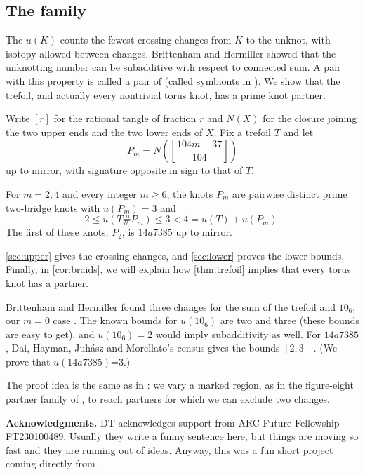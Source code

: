 \documentclass[a4paper,11pt]{amsart}
\let\emph\relax
\numberwithin{equation}{subsection}
\theoremstyle{plain}
\theoremstyle{remark}
\begin{document}
\subsection{The family}\label{sec:main}

The \emph{unknotting number} $u(K)$ counts the fewest crossing changes from $K$ to the unknot, with isotopy allowed between changes. Brittenham and Hermiller \cite{BH-annals} showed that the unknotting number can be subadditive with respect to connected sum. A pair with this property is called a pair of \emph{partners} (called symbionts in \cite{BH-small}). We show that the trefoil, and actually every nontrivial torus knot, has a prime knot partner.

Write $[r]$ for the rational tangle of fraction $r$ and $N(X)$ for the closure joining the two upper ends and the two lower ends of $X$. Fix a trefoil $T$ and let
\[
P_m=N\!\left(\left[\frac{104m+37}{104}\right]\right)
\]
up to mirror, with signature opposite in sign to that of $T$.

\begin{Theorem}\label{thm:trefoil}
For $m=2,4$ and every integer $m\geq6$, the knots $P_m$ are pairwise distinct prime two-bridge knots with $u(P_m)=3$ and
\[
2\leq u(T\#P_m)\leq3<4=u(T)+u(P_m).
\]
The first of these knots, $P_2$, is $14a7385$ up to mirror.
\end{Theorem}

\autoref{sec:upper} gives the crossing changes, and \autoref{sec:lower} proves the lower bounds. Finally, in \autoref{cor:braids}, we will explain how \autoref{thm:trefoil} implies that every torus knot has a partner.

\begin{Remark}
Brittenham and Hermiller found three changes for the sum of the trefoil and $10_6$, our $m=0$ case \cite{BH-small}. The known bounds for $u(10_6)$ are two and three (these bounds are easy to get), and $u(10_6)=2$ would imply subadditivity as well. For $14a7385$, Dai, Hayman, Juh\'asz and Morellato's census gives the bounds $[2,3]$ \cite[Section~5.4 and supporting data]{DHJM}. (We prove that $u(14a7385)$=3.)
\end{Remark}

The proof idea is the same as in \cite{DKT}:
we vary a marked region, as in the figure-eight partner family of \cite[Section~5D]{DKT}, to reach partners for which we can exclude two changes.
\smallskip

\noindent\textbf{Acknowledgments.}
DT acknowledges support from ARC Future Fellowship FT230100489. Usually they write a funny sentence here, but things are moving so fast and they are running out of ideas. Anyway, this was a fun short project coming directly from \cite{DKT}.
\smallskip
\end{document}

